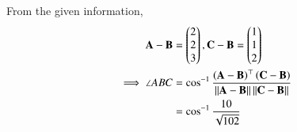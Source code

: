 From the given information, 
\begin{align}
\mathbf{A} - \mathbf{B} &= \begin{pmatrix}2\\2\\3\end{pmatrix},
\mathbf{C} - \mathbf{B} = \begin{pmatrix}1\\1\\2\end{pmatrix}\\
	\implies \angle{ABC} &= \cos^{-1}{\frac{\left(\mathbf{A} -\mathbf{B}\right)^{\top}\left(\mathbf{C}-\mathbf{B}\right)}{\left\lVert\mathbf{A} -\mathbf{B}\right\rVert  \left\lVert\mathbf{C}-\mathbf{B}\right\rVert}}\\
&= \cos^{-1}{\frac{10}{\sqrt{102}}}\\
\end{align}



